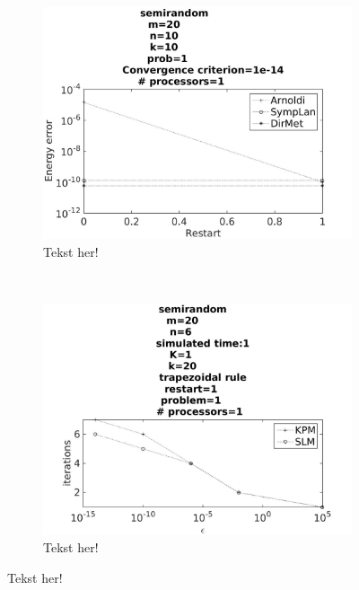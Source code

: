 \begin{figure}[H]
        \centering
        \begin{subfigure}[b]{0.45\textwidth}
                \includegraphics[width=\textwidth]{../MATLAB/fig/compareEnergy.jpg}
                \caption{ Tekst her! }
                \label{fig:intconvtrap}
        \end{subfigure}%
        ~
        \begin{subfigure}[b]{0.45\textwidth}
                \includegraphics[width=\textwidth]{../MATLAB/fig/compareIter.jpg}
                \caption{ Tekst her! }
                \label{fig:intconveul}
        \end{subfigure}
        \caption{Tekst her! }
        \label{fig:intconv}
\end{figure}

